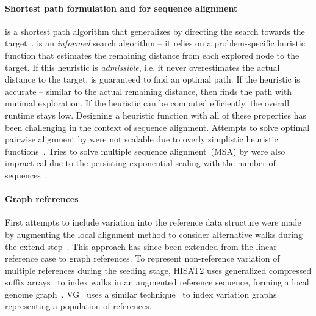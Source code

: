 \paragraph{Shortest path formulation and \A for sequence alignment}
\A is a shortest path algorithm that generalizes \dijkstra by directing the
search towards the target~\citep{hart1968formal}. \A is an \emph{informed}
search algorithm -- it relies on a problem-specific huristic function that
estimates the remaining distance from each explored node to the target. If this
heuristic is \emph{admissible}, i.e. it never overestimates the actual distance
to the target, \A is guaranteed to find an optimal path. If the heuristic is
accurate -- similar to the actual remaining distance, then \A finds the path
with minimal exploration. If the heuristic can be computed efficiently, the
overall runtime stays low. Designing a heuristic function with all of these
properties has been challenging in the context of sequence alignment. Attempts
to solve optimal pairwise alignment by \A were not scalable due to overly
simplistic heuristic functions~\cite{dox2018efficient}. Tries to solve multiple
sequence alignment~(MSA) by \A were also impractical due to the persisting
exponential scaling with the number of
sequences~\citep{lermen2000practical,zhou2002multiple,mcnaughton2002memory}.

\paragraph{Graph references}
First attempts to include variation into the reference data structure were made
by augmenting the local alignment method to consider alternative walks during
the extend step~\cite{schneeberger_simultaneous_2009,palmapper}. This approach
has since been extended from the linear reference case to graph references. To
represent non-reference variation of multiple references during the seeding
stage, HISAT2 uses generalized compressed suffix
arrays~\cite{siren_indexing_2014} to index walks in an augmented reference
sequence, forming a local genome graph~\cite{kim_graphbased_2019}.
VG~\cite{garrison_variation_2018} uses a similar
technique~\cite{siren_indexing_2017} to index variation graphs representing a
population of references.
